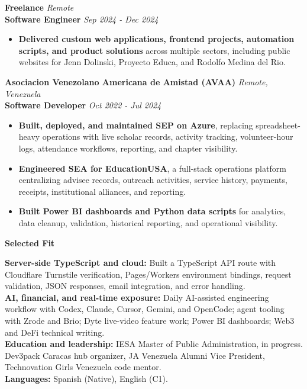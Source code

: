 \documentclass[10pt]{article}
\begin{document}
\vspace{3pt}
\textbf{Freelance} \hfill \textit{Remote} \\
\textbf{Software Engineer} \hfill \textit{Sep 2024 - Dec 2024}
\begin{itemize}
    \item \textbf{Delivered custom web applications, frontend projects, automation scripts, and product solutions} across multiple sectors, including public websites for Jenn Dolinski, Proyecto Educa, and Rodolfo Medina del Rio.
\end{itemize}

\vspace{3pt}
\textbf{Asociacion Venezolano Americana de Amistad (AVAA)} \hfill \textit{Remote, Venezuela} \\
\textbf{Software Developer} \hfill \textit{Oct 2022 - Jul 2024}
\begin{itemize}
    \item \textbf{Built, deployed, and maintained SEP on Azure}, replacing spreadsheet-heavy operations with live scholar records, activity tracking, volunteer-hour logs, attendance workflows, reporting, and chapter visibility.
    \item \textbf{Engineered SEA for EducationUSA}, a full-stack operations platform centralizing advisee records, outreach activities, service history, payments, receipts, institutional alliances, and reporting.
    \item \textbf{Built Power BI dashboards and Python data scripts} for analytics, data cleanup, validation, historical reporting, and operational visibility.
\end{itemize}

\vspace{4pt}
\begin{center}
    \textbf{Selected Fit}
\end{center}
\vspace{-6pt}
\textbf{Server-side TypeScript and cloud:} Built a TypeScript API route with Cloudflare Turnstile verification, Pages/Workers environment bindings, request validation, JSON responses, email integration, and error handling. \\
\textbf{AI, financial, and real-time exposure:} Daily AI-assisted engineering workflow with Codex, Claude, Cursor, Gemini, and OpenCode; agent tooling with Zrode and Brio; Dyte live-video feature work; Power BI dashboards; Web3 and DeFi technical writing. \\
\textbf{Education and leadership:} IESA Master of Public Administration, in progress. Dev3pack Caracas hub organizer, JA Venezuela Alumni Vice President, Technovation Girls Venezuela code mentor. \\
\textbf{Languages:} Spanish (Native), English (C1).
\end{document}
